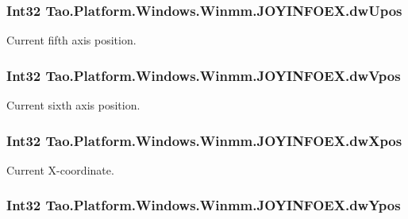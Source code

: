\hypertarget{struct_tao_1_1_platform_1_1_windows_1_1_winmm_1_1_j_o_y_i_n_f_o_e_x_aaa53c146810997488f113ec6d277b847}{
\subsubsection[{dwUpos}]{\setlength{\rightskip}{0pt plus 5cm}Int32 {\bf Tao.Platform.Windows.Winmm.JOYINFOEX.dwUpos}}}
\label{struct_tao_1_1_platform_1_1_windows_1_1_winmm_1_1_j_o_y_i_n_f_o_e_x_aaa53c146810997488f113ec6d277b847}


Current fifth axis position. 

\hypertarget{struct_tao_1_1_platform_1_1_windows_1_1_winmm_1_1_j_o_y_i_n_f_o_e_x_a577e3965af18d37933333f4e93f46c67}{
\subsubsection[{dwVpos}]{\setlength{\rightskip}{0pt plus 5cm}Int32 {\bf Tao.Platform.Windows.Winmm.JOYINFOEX.dwVpos}}}
\label{struct_tao_1_1_platform_1_1_windows_1_1_winmm_1_1_j_o_y_i_n_f_o_e_x_a577e3965af18d37933333f4e93f46c67}


Current sixth axis position. 

\hypertarget{struct_tao_1_1_platform_1_1_windows_1_1_winmm_1_1_j_o_y_i_n_f_o_e_x_ad5988d07e0544cbe851a0e1dab91579f}{
\subsubsection[{dwXpos}]{\setlength{\rightskip}{0pt plus 5cm}Int32 {\bf Tao.Platform.Windows.Winmm.JOYINFOEX.dwXpos}}}
\label{struct_tao_1_1_platform_1_1_windows_1_1_winmm_1_1_j_o_y_i_n_f_o_e_x_ad5988d07e0544cbe851a0e1dab91579f}


Current X-\/coordinate. 

\hypertarget{struct_tao_1_1_platform_1_1_windows_1_1_winmm_1_1_j_o_y_i_n_f_o_e_x_a566b2cdf669ef116d0376faa3f1c39fa}{
\subsubsection[{dwYpos}]{\setlength{\rightskip}{0pt plus 5cm}Int32 {\bf Tao.Platform.Windows.Winmm.JOYINFOEX.dwYpos}}}
\label{struct_tao_1_1_platform_1_1_windows_1_1_winmm_1_1_j_o_y_i_n_f_o_e_x_a566b2cdf669ef116d0376faa3f1c39fa}


